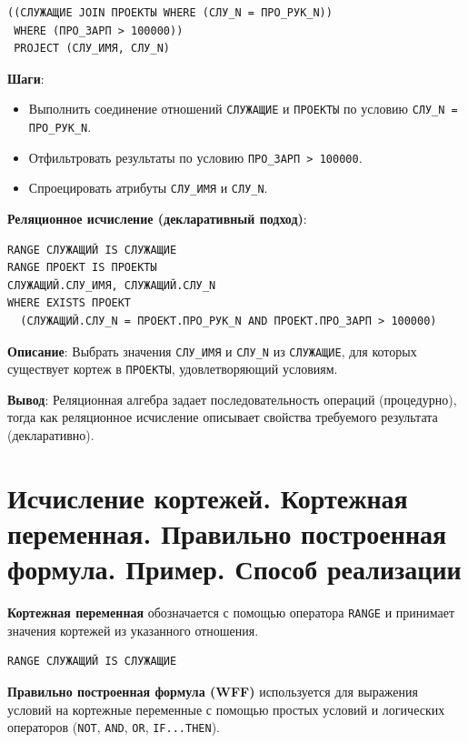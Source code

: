 \documentclass[a4paper,12pt]{article}
\begin{document}
\begin{verbatim}
((СЛУЖАЩИЕ JOIN ПРОЕКТЫ WHERE (СЛУ_N = ПРО_РУК_N))
 WHERE (ПРО_ЗАРП > 100000))
 PROJECT (СЛУ_ИМЯ, СЛУ_N)
\end{verbatim}

\textbf{Шаги}:

\begin{itemize}
    \item Выполнить соединение отношений \texttt{СЛУЖАЩИЕ} и \texttt{ПРОЕКТЫ} по условию \texttt{СЛУ\_N = ПРО\_РУК\_N}.
    \item Отфильтровать результаты по условию \texttt{ПРО\_ЗАРП > 100000}.
    \item Спроецировать атрибуты \texttt{СЛУ\_ИМЯ} и \texttt{СЛУ\_N}.
\end{itemize}

\textbf{Реляционное исчисление (декларативный подход)}:

\begin{verbatim}
RANGE СЛУЖАЩИЙ IS СЛУЖАЩИЕ
RANGE ПРОЕКТ IS ПРОЕКТЫ
СЛУЖАЩИЙ.СЛУ_ИМЯ, СЛУЖАЩИЙ.СЛУ_N 
WHERE EXISTS ПРОЕКТ
  (СЛУЖАЩИЙ.СЛУ_N = ПРОЕКТ.ПРО_РУК_N AND ПРОЕКТ.ПРО_ЗАРП > 100000)
\end{verbatim}

\textbf{Описание}: Выбрать значения \texttt{СЛУ\_ИМЯ} и \texttt{СЛУ\_N} из \texttt{СЛУЖАЩИЕ}, для которых существует кортеж в \texttt{ПРОЕКТЫ}, удовлетворяющий условиям.

\textbf{Вывод}: Реляционная алгебра задает последовательность операций (процедурно), тогда как реляционное исчисление описывает свойства требуемого результата (декларативно).


\section{Исчисление кортежей. Кортежная переменная. Правильно построенная формула. Пример. Способ реализации}

\textbf{Кортежная переменная} обозначается с помощью оператора \texttt{RANGE} и принимает значения кортежей из указанного отношения.

\begin{verbatim}
RANGE СЛУЖАЩИЙ IS СЛУЖАЩИЕ
\end{verbatim}

\textbf{Правильно построенная формула (WFF)} используется для выражения условий на кортежные переменные с помощью простых условий и логических операторов (\texttt{NOT}, \texttt{AND}, \texttt{OR}, \texttt{IF...THEN}).
\end{document}
